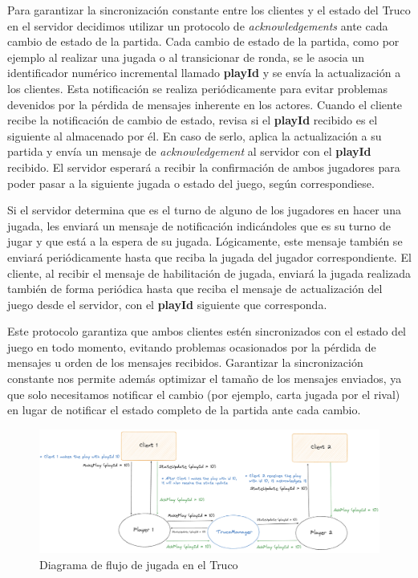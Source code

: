 Para garantizar la sincronización constante entre los clientes y el estado del Truco en el servidor decidimos utilizar un protocolo de \textit{acknowledgements} ante cada cambio de estado de la partida. Cada cambio de estado de la partida,
como por ejemplo al realizar una jugada o al transicionar de ronda, se le asocia un identificador numérico incremental llamado \textbf{playId} y se envía la actualización a los clientes. Esta notificación se realiza periódicamente para evitar problemas devenidos por la
pérdida de mensajes inherente en los actores. Cuando el cliente recibe la notificación de cambio de estado, revisa si el \textbf{playId} recibido es el siguiente al almacenado por él. En caso de serlo, aplica la actualización a su partida y envía
un mensaje de \textit{acknowledgement} al servidor con el \textbf{playId} recibido. El servidor esperará a recibir la confirmación de ambos jugadores para poder pasar a la siguiente jugada o estado del juego, según correspondiese.

Si el servidor determina que es el turno de alguno de los jugadores en hacer una jugada, les enviará un mensaje de notificación indicándoles que es su turno de jugar y que está a la espera de su jugada. Lógicamente, este mensaje también se enviará
periódicamente hasta que reciba la jugada del jugador correspondiente. El cliente, al recibir el mensaje de habilitación de jugada, enviará la jugada realizada también de forma periódica hasta que reciba el mensaje de actualización del juego desde el servidor,
con el \textbf{playId} siguiente que corresponda.

Este protocolo garantiza que ambos clientes estén sincronizados con el estado del juego en todo momento, evitando problemas ocasionados por la pérdida de mensajes u orden de los mensajes recibidos. Garantizar la sincronización constante nos permite además optimizar el tamaño
de los mensajes enviados, ya que solo necesitamos notificar el cambio (por ejemplo, carta jugada por el rival) en lugar de notificar el estado completo de la partida ante cada cambio. 

\newpage

\begin{figure}[htbp]
    \centering
    \includegraphics[width=1\textwidth]{../assets/truco-state-update.png}
    \caption{Diagrama de flujo de jugada en el Truco}
\end{figure}

